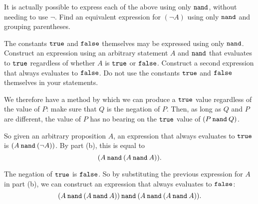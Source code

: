 \documentclass[twoside,12pt]{article}
\begin{document}
\begin{problem}{24}
 It is actually possible to express each of the above using only $\mathbin{\mathtt{nand}}$, without needing to use $\neg$. Find an equivalent expression for $(\neg A)$ using only $\mathbin{\mathtt{nand}}$ and grouping parentheses.


 The constants $\mathbin{\mathtt{true}}$ and $\mathbin{\mathtt{false}}$ themselves may be expressed using only $\mathbin{\mathtt{nand}}$. Construct an expression using an arbitrary statement $A$ and $\mathbin{\mathtt{nand}}$ that evaluates to $\mathbin{\mathtt{true}}$ regardless of whether $A$ is $\mathbin{\mathtt{true}}$ or $\mathbin{\mathtt{false}}$. Construct a second expression that always evaluates to $\mathbin{\mathtt{false}}$. Do not use the constants $\mathbin{\mathtt{true}}$ and $\mathbin{\mathtt{false}}$ themselves in your statements.

We therefore have a method by which we can produce a $\mathbin{\mathtt{true}}$ value regardless of the value of $P$: make sure that $Q$ is the negation of $P$. Then, as long as $Q$ and $P$ are different, the value of $P$ has no bearing on the $\mathbin{\mathtt{true}}$ value of $(P \mathbin{\mathtt{nand}} Q)$.

So given an arbitrary proposition $A$, an expression that always evaluates to $\mathbin{\mathtt{true}}$ is $(A \mathbin{\mathtt{nand}} (\neg A))$. By part (b), this is equal to
\[
(A \mathbin{\mathtt{nand}} (A \mathbin{\mathtt{nand}} A)).
\]

The negation of $\mathbin{\mathtt{true}}$ is $\mathbin{\mathtt{false}}$. So by substituting the previous expression for $A$ in part (b), we can construct an expression that always evaluates to $\mathbin{\mathtt{false}}$:
\[
(A \mathbin{\mathtt{nand}} (A \mathbin{\mathtt{nand}} A)) \mathbin{\mathtt{nand}} (A \mathbin{\mathtt{nand}} (A \mathbin{\mathtt{nand}} A)).
\]


\eparts


\end{problem}
\end{document}
